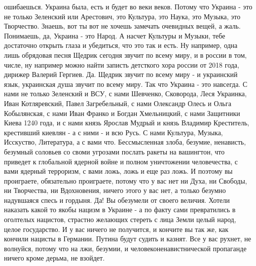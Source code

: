 ошибаешься. Украина была, есть и будет во веки веков. Потому что Украина - это
не только Зеленский или Арестович, это Культура, это Наука, это Музыка, это
Творчество. Знаешь, вот ты вот не хочешь замечать очевидных вещей, а жаль.
Понимаешь, да, Украина - это Народ. А насчет Культуры и Музыки, тебе достаточно
открыть глаза и убедиться, что это так и есть. Ну например, одна лишь обрядовая
песня Щедрик сегодня звучит по всему миру, и в россии в том, числе, ну например
можно найти записть детсткого хора россии от 2018 года, дирижер Валерий
Гергиев. Да. Щедрик звучит по всему миру - и украинский язык, украинская душа
звучит по всему миру. Так что Украина - это навсегда. С нами не только
Зеленский и ВСУ, с нами Шевченко, Сковорода, Леся Украинка, Иван Котляревский,
Павел Загребельный, с нами Олександр Олесь и Ольга Кобылянская, с нами Иван
Франко и Богдан Хмельницкий, с нами Защитники Киева 1240 года, и с нами князь
Ярослав Мудрый и князь Владимир Креститель, крестивший киевлян - а с ними - и
всю Русь. С нами Культура, Музыка, Исскуство, Литература, а с вами что.
Бессмысленная злоба, безумие, ненависть, безумный соловьев со своми угрозами
послать ракеты на вашингтон, что приведет к глобальной ядерной войне и полном
уничтожении человечества, с вами ядерный терроризм, с вами ложь, ложь и еще раз
ложь. И поэтому вы проиграете, обязательно проиграете, потому что у вас нет ни
Духа, ни Свободы, ни Творчества, ни Вдохновения, ничего этого у вас нет, а
только безумно надувшаяся спесь и гордыня. Да! Вы обезумели от своего величия.
Хотели наказать какой то якобы нацизм в Украине - а по факту сами превратились
в оголтелых нацистов, страстно желающих стереть с лица Земли целый народ, целое
государство. И у вас ничего не получится, и кончите вы так же, как кончили
нацисты в Германии. Путина будут судить и казнят. Все у вас рухнет, не
волнуйся, потому что на лжи, безумии, и человеконенавистнической пропаганде
ничего кроме дерьма, не взойдет.





